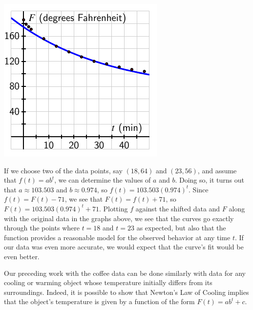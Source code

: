 \documentclass[nooutcomes]{ximera}
\begin{document}
\begin{image}
\includegraphics{modeling-coffee-original}
\end{image}

If we choose two of the data points, say \((18,64)\) and \((23,56)\), and assume that \(f(t) = ab^t\), we can determine the values of \(a\) and \(b\).  Doing so, it turns out that \(a \approx 103.503\) and \(b \approx 0.974\), so \(f(t) = 103.503 ( 0.974)^t\).  Since \(f(t) = F(t) - 71\), we see that \(F(t) = f(t) + 71\), so \(F(t) = 103.503 (0.974)^t + 71\).  Plotting \(f\) against the shifted data and \(F\) along with the original data in the graphs above, we see that the curves go exactly through the points where \(t = 18\) and \(t = 23\) as expected, but also that the function provides a reasonable model for the observed behavior at any time \(t\).  If our data was even more accurate, we would expect that the curve's fit would be even better.

Our preceding work with the coffee data can be done similarly with data for any cooling or warming object whose temperature initially differs from its surroundings.  Indeed, it is possible to show that Newton's Law of Cooling implies that the object's temperature is given by a function of the form \(F(t) = ab^t + c\).
\end{document}
